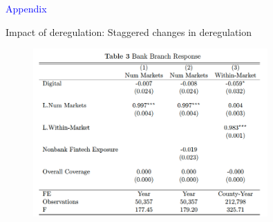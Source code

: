 \documentclass[notes,10pt, aspectratio=169]{beamer}
\begin{document}
    \appendix

    \begin{frame}[noframenumbering]
        \centering
        \huge \textcolor{blue}{Appendix}
    \end{frame}

    \begin{frame}{Impact of deregulation: Staggered changes in deregulation\hyperlink{sorting_time}{}
        }\label{stag_time}

    \begin{figure}
        \centering
            \includegraphics[width=0.8\textwidth]{imgs/tab3.png}
            \label{fig:my_label}
        \end{figure}
        
        \end{frame}
    
\end{document}
